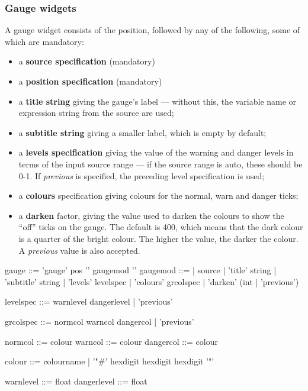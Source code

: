 \subsubsection{Gauge widgets}
A gauge widget consists of the position, followed by any of the following,
some of which are mandatory:
\begin{itemize}
\item a \textbf{source specification} (mandatory)
\item a \textbf{position specification} (mandatory)
\item a \textbf{title string} giving the gauge's label --- without this,
the variable name or expression string from the source are used;
\item a \textbf{subtitle string} giving a smaller label, which is empty
by default;
\item a \textbf{levels specification} giving the value of the warning
and danger levels in terms of the input source range --- if the source range is
auto, these should be 0-1. If \emph{previous} is specified, the preceding
level specification is used;
\item a \textbf{colours} specification giving colours for 
the normal, warn and danger ticks;
\item a \textbf{darken} factor, giving the value used to darken the colours
to show the ``off'' ticks on the gauge. The default is 400, which means that
the dark colour is a quarter of the bright colour. The higher the value, 
the darker the colour. A \emph{previous} value is also accepted.
\end{itemize}
\begin{v}
gauge       ::= 'gauge' pos '{' { gaugemod } '}'
gaugemod    ::=
            |   source
            |   'title' string
            |   'subtitle' string
            |   'levels' levelspec
            |   'colours' grcolspec
            |   'darken' (int | 'previous')

levelspec   ::= warnlevel dangerlevel
            |   'previous'
            
grcolspec   ::= normcol warncol dangercol
            |   'previous'
            
normcol     ::= colour
warncol     ::= colour
dangercol   ::= colour

colour      ::= colourname
            |   '"#' hexdigit hexdigit hexdigit '"'

warnlevel   ::= float            
dangerlevel ::= float            
\end{v}

